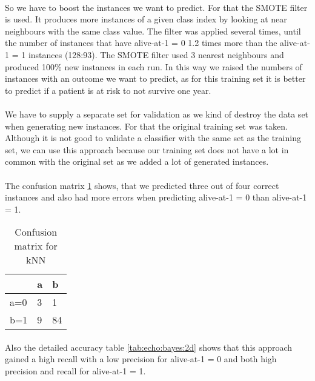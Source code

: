 \documentclass[paper=a4, fontsize=11pt]{scrartcl} %
\numberwithin{equation}{section} %
\numberwithin{figure}{section} %
\numberwithin{table}{section} %
\begin{document}
\paragraph{}So we have to boost the instances we want to predict. For that the SMOTE filter is used. It produces more instances of a given class index by looking at near neighbours with the same class value. The filter was applied several times, until the number of instances that have alive-at-1 = 0 1.2 times more than the alive-at-1 = 1 instances (128:93). The SMOTE filter used 3 nearest neighbours and produced 100\% new instances in each run. In this way we raised the numbers of instances with an outcome we want to predict, as for this training set it is better to predict if a patient is at risk to not survive one year.

\paragraph{}We have to supply a separate set for validation as we kind of destroy the data set when generating new instances. For that the original training set was taken. Although it is not good to validate a classifier with the same set as the training set, we can use this approach because our training set does not have a lot in common with the original set as we added a lot of generated instances.


\paragraph{}The confusion matrix \ref{tab:echo:bayes:2c} shows, that we predicted three out of four correct instances and also had more errors when predicting alive-at-1 = 0 than  alive-at-1 = 1.

\begin{table}[h]
\centering
\begin{tabular}{|l|ll|}
\hline
 & a &	b \\
\hline
a=0 & 3 & 1 \\
b=1 & 9 & 84\\
\hline
\end{tabular}
\caption{Confusion matrix for kNN}
\label{tab:echo:bayes:2c}
\end{table}

\paragraph{}Also the detailed accuracy table \ref{tab:echo:bayes:2d} shows that this approach gained a high recall with a low precision for alive-at-1 = 0 and both high precision and recall for alive-at-1 = 1.
\end{document}
